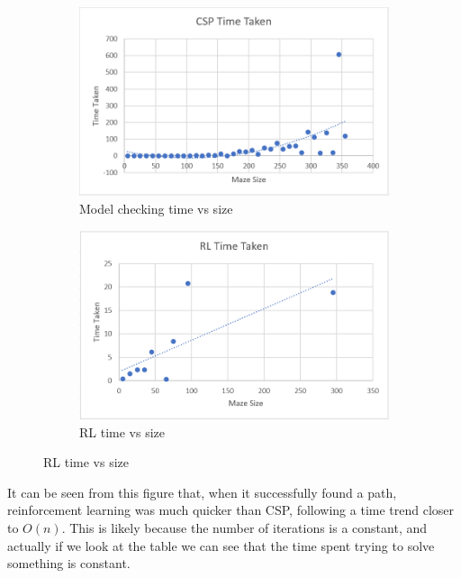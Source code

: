\documentclass{article}
\newcommand\tab[1][1cm]{\hspace*{#1}}
\begin{document}
        \begin{table}[ht!]
            \resizebox{\textwidth}{!}{
                
            }
        \end{table}
        \newpage


        \begin{figure}[ht]
            \begin{subfigure}{.5\textwidth}
                \centering
                \includegraphics[scale=0.5]{assets/CSPTimeVsSize.PNG}
                \caption{Model checking time vs size}
            \end{subfigure}
            \begin{subfigure}{.5\textwidth}
                \centering
                \includegraphics[scale=0.5]{assets/RLTimeVsSize.PNG}
                \caption{RL time vs size}
            \end{subfigure}
        \end{figure}

         \tab It can be seen from this figure that, when it successfully found a 
         path, reinforcement learning was much quicker than CSP, following a 
         time trend closer to $O(n)$. This is likely because the number of
         iterations is a constant, and actually if we look at the table we can
         see that the time spent trying to solve something is constant. 
\end{document}
